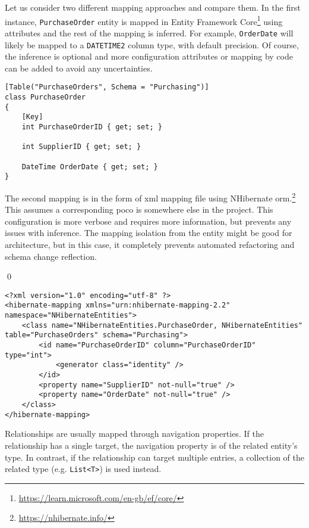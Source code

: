 \begin{example}
\small
Let us consider two different mapping approaches and compare them. In the first instance, \texttt{PurchaseOrder} entity is mapped in Entity Framework Core\footnote{\url{https://learn.microsoft.com/en-gb/ef/core/}} using attributes and the rest of the mapping is inferred. For example, \texttt{OrderDate} will likely be mapped to a \texttt{DATETIME2} column type, with default precision. Of course, the inference is optional and more configuration attributes or mapping by code can be added to avoid any uncertainties. 
\begin{lstlisting}[language=CSharp]
[Table("PurchaseOrders", Schema = "Purchasing")]
class PurchaseOrder
{
    [Key]
    int PurchaseOrderID { get; set; }

    int SupplierID { get; set; }

    DateTime OrderDate { get; set; }
}
\end{lstlisting}
The second mapping is in the form of \acrshort{xml} mapping file using NHibernate \acrshort{orm}.\footnote{\url{https://nhibernate.info/}} This assumes a corresponding \acrshort{poco} is somewhere else in the project. This configuration is more verbose and requires more information, but prevents any issues with inference. The mapping isolation from the entity might be good for architecture, but in this case, it completely prevents automated refactoring and schema change reflection.

\qed
\begin{lstlisting}[language=CSharp]
<?xml version="1.0" encoding="utf-8" ?>
<hibernate-mapping xmlns="urn:nhibernate-mapping-2.2" namespace="NHibernateEntities">
    <class name="NHibernateEntities.PurchaseOrder, NHibernateEntities" table="PurchaseOrders" schema="Purchasing">
        <id name="PurchaseOrderID" column="PurchaseOrderID" type="int">
            <generator class="identity" />
        </id>
        <property name="SupplierID" not-null="true" />
        <property name="OrderDate" not-null="true" />
    </class>
</hibernate-mapping>
\end{lstlisting}
\end{example}

Relationships are usually mapped through navigation properties. If the relationship has a single target, the navigation property is of the related entity's type. In contrast, if the relationship can target multiple entries, a collection of the related type (e.g. \texttt{List<T>}) is used instead.

